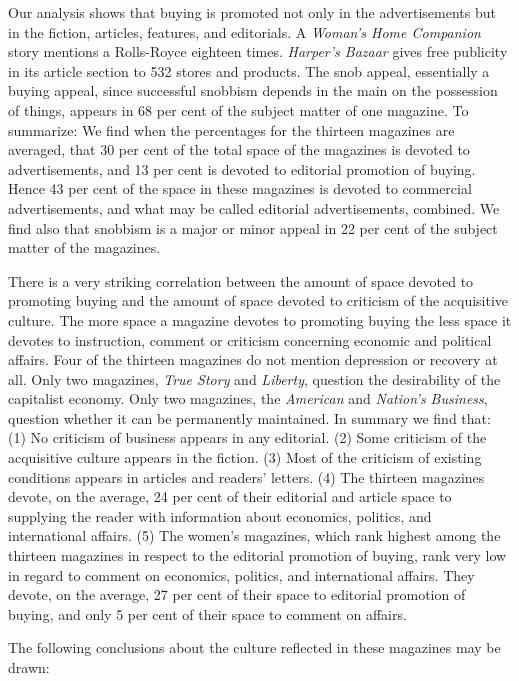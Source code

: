 \documentclass[nohyper,openany,nobib]{tufte-book}
\begin{document}
Our analysis shows that buying is promoted not only in the
advertisements but in the fiction, articles, features, and editorials. A
\emph{Woman's Home Companion} story mentions a Rolls-Royce eighteen
times. \emph{Harper's Bazaar} gives free publicity in its article
section to 532 stores and products. The snob appeal, essentially a
buying appeal, since successful snobbism depends in the main on the
possession of things, appears in 68 per cent of the subject matter of
one magazine. To summarize: We find when the percentages for the
thirteen magazines are averaged, that 30 per cent of the total space of
the magazines is devoted to advertisements, and 13 per cent is devoted
to editorial promotion of buying. Hence 43 per cent of the space in
these magazines is devoted to commercial advertisements, and what may be
called editorial advertisements, combined. We find also that snobbism is
a major or minor appeal in 22 per cent of the subject matter of the
magazines.

There is a very striking correlation between the amount of space devoted
to promoting buying and the amount of space devoted to criticism of the
acquisitive culture. The more space a magazine devotes to promoting
buying the less space it devotes to instruction, comment or criticism
concerning economic and political affairs. Four of the thirteen
magazines do not mention depression or recovery at all. Only two
magazines, \emph{True Story} and \emph{Liberty}, question the
desirability of the capitalist economy. Only two magazines, the
\emph{American} and \emph{Nation's Business}, question whether it can be
permanently maintained. In summary we find that: (1) No criticism of
business appears in any editorial. (2) Some criticism of the acquisitive
culture appears in the fiction. (3) Most of the criticism of existing
conditions appears in articles and readers' letters. (4) The thirteen
magazines devote, on the average, 24 per cent of their editorial and
article space to supplying the reader with information about economics,
politics, and international affairs. (5) The women's magazines, which
rank highest among the thirteen magazines in respect to the editorial
promotion of buying, rank very low in regard to comment on economics,
politics, and international affairs. They devote, on the average, 27 per
cent of their space to editorial promotion of buying, and only 5 per
cent of their space to comment on affairs.

The following conclusions about the culture reflected in these magazines
may be drawn:
\end{document}
